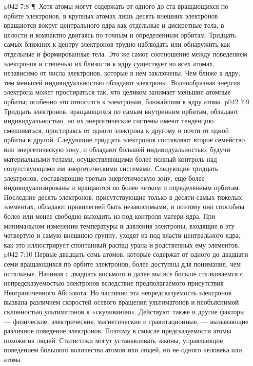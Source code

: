 \vs p042 7:8 \P\ Хотя атомы могут содержать от одного до ста вращающихся по орбите электронов, в крупных атомах лишь десять внешних электронов вращаются вокруг центрального ядра как отдельные и дискретные тела, в целости и компактно двигаясь по точным и определенным орбитам. Тридцать самых ближних к центру электронов трудно наблюдать или обнаружить как отдельные и формированные тела. Это же самое соотношение между поведением электронов и степенью их близости к ядру существует во всех атомах, независимо от числа электронов, которые в нем заключены. Чем ближе к ядру, тем меньшей индивидуальностью обладают электроны. Волнообразная энергия электрона может простираться так, что целиком занимает меньшие атомные орбиты; особенно это относится к электронам, ближайшим к ядру атома.
\vs p042 7:9 Тридцать электронов, вращающихся по самым внутренним орбитам, обладают индивидуальностью, но их энергетические системы имеют тенденцию смешиваться, простираясь от одного электрона к другому и почти от одной орбиты к другой. Следующие тридцать электронов составляют второе семейство, или энергетическую зону, и обладают большей индивидуальностью, будучи материальными телами, осуществляющими более полный контроль над сопутствующими им энергетическими системами. Следующие тридцать электронов, составляющие третью энергетическую зону, еще более индивидуализированы и вращаются по более четким и определенным орбитам. Последние десять электронов, присутствующие только в десяти самых тяжелых элементах, обладают привилегией быть независимыми, и поэтому они способны более или менее свободно выходить из\hyp{}под контроля матери\hyp{}ядра. При минимальном изменении температуры и давления электроны, входящие в эту четвертую и самую внешнюю группу, уходят из\hyp{}под власти центрального ядра, как это иллюстрирует спонтанный распад урана и родственных ему элементов.
\vs p042 7:10 Первые двадцать семь атомов, которые содержат от одного до двадцати семи вращающихся по орбите электронов, более доступны для понимания, чем остальные. Начиная с двадцать восьмого и далее мы все больше сталкиваемся с непредсказуемостью электронов вследствие предполагаемого присутствия Неограниченного Абсолюта. Но частично эта непредсказуемость электронов вызвана различием скоростей осевого вращения ультиматонов и необъяснимой склонностью ультиматонов к «скучиванию». Действуют также и другие факторы --- физические, электрические, магнетические и гравитационные, --- вызывающие различное поведение электронов. Поэтому в смысле предсказуемости атомы похожи на людей. Статистики могут устанавливать законы, управляющие поведением большого количества атомов или людей, но не одного человека или атома.
